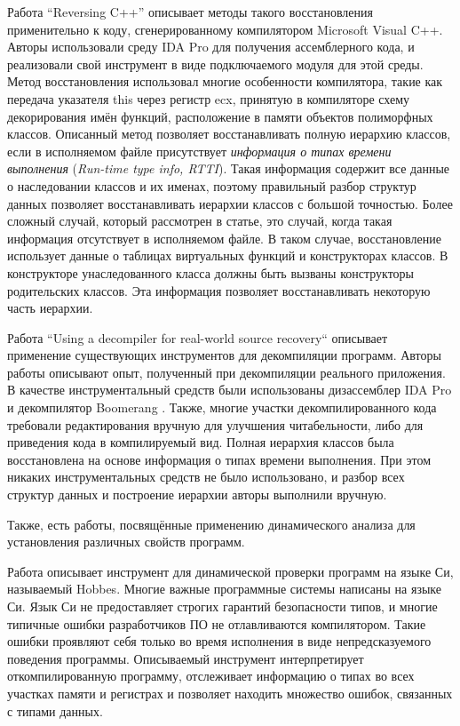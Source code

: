 \documentclass[a4paper,12pt,russian]{article}
\newcommand{\code}[1]{\textsf{#1}}
\begin{document}
Работа ``Reversing C++'' \cite{reversing_cpp} описывает методы такого восстановления применительно к коду, сгенерированному компилятором Microsoft Visual C++.
Авторы использовали среду IDA Pro \cite{ida_pro} для получения ассемблерного кода, и реализовали свой инструмент в виде подключаемого модуля для этой среды.
Метод восстановления использовал многие особенности компилятора, такие как передача указателя \code{this} через регистр \code{ecx}, принятую в компиляторе схему декорирования имён функций, расположение в памяти объектов полиморфных классов.
Описанный метод позволяет восстанавливать полную иерархию классов, если в исполняемом файле присутствует \emph{информация о типах времени выполнения} (\emph{Run-time type info, RTTI}).
Такая информация содержит все данные о наследовании классов и их именах, поэтому правильный разбор структур данных позволяет восстанавливать иерархии классов с большой точностью.
Более сложный случай, который рассмотрен в статье, это случай, когда такая информация отсутствует в исполняемом файле.
В таком случае, восстановление использует данные о таблицах виртуальных функций и конструкторах классов.
В конструкторе унаследованного класса должны быть вызваны конструкторы родительских классов.
Эта информация позволяет восстанавливать некоторую часть иерархии.


Работа ``Using a decompiler for real-world source recovery`` \cite{real_decomp} описывает применение существующих инструментов для декомпиляции программ.
Авторы работы описывают опыт, полученный при декомпиляции реального приложения.
В качестве инструментальный средств были использованы дизассемблер IDA Pro \cite{ida_pro} и декомпилятор Boomerang \cite{boomerang}.
Также, многие участки декомпилированного кода требовали редактирования вручную для улучшения читабельности, либо для приведения кода в компилируемый вид.
Полная иерархия классов была восстановлена на основе информация о типах времени выполнения.
При этом никаких инструментальных средств не было использовано, и разбор всех структур данных и построение иерархии авторы выполнили вручную.

Также, есть работы, посвящённые применению динамического анализа для установления различных свойств программ.

Работа \cite{typechecking} описывает инструмент для динамической проверки программ на языке Си, называемый \code{Hobbes}.
Многие важные программные системы написаны на языке Си.
Язык Си не предоставляет строгих гарантий безопасности типов, и многие типичные ошибки разработчиков ПО не отлавливаются компилятором. Такие ошибки проявляют себя только во время исполнения в виде непредсказуемого поведения программы.
Описываемый инструмент интерпретирует откомпилированную программу, отслеживает информацию о типах во всех участках памяти и регистрах и позволяет находить множество ошибок, связанных с типами данных.
\end{document}
